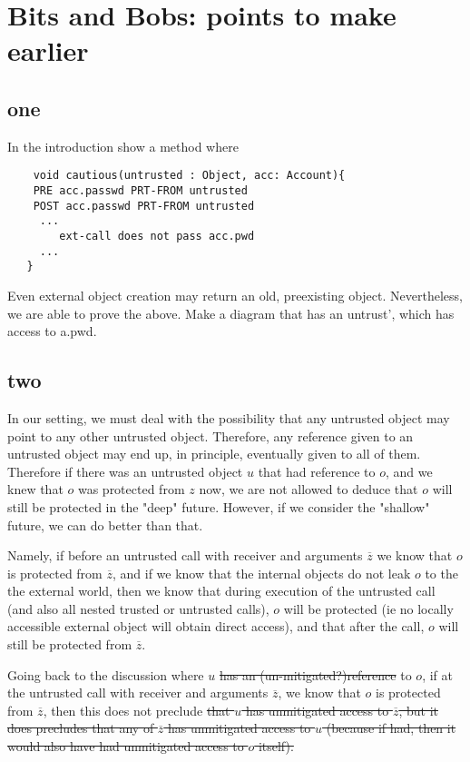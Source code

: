  \newcommand{\sdOct}[1]{#1}
\newcommand{\re}{\mathit{e}}

\section{Bits and Bobs: points to make earlier}

\subsection{one}
In the introduction show a method where
\begin{lstlisting}
    void cautious(untrusted : Object, acc: Account){
    PRE acc.passwd PRT-FROM untrusted
    POST acc.passwd PRT-FROM untrusted
     ...
        ext-call does not pass acc.pwd
     ...
   }
\end{lstlisting}

Even external object creation may return an old, preexisting object.
Nevertheless, we are able to prove the above. Make a diagram that has an untrust', which has access to a.pwd. 


\subsection{two}
In our setting, we must deal with the possibility  that any untrusted object may point to any other untrusted object.
Therefore, any reference given to an untrusted object may end up, in principle,  eventually given to all of them.
Therefore if there was an untrusted object $u$ that had reference to $o$,  and we knew that $o$ was protected from $z$ now, we are not
allowed   to deduce that $o$ will still be protected in the "deep" future.
However, if we consider the "shallow" future, we can do better than that.

Namely, if  before an untrusted call with receiver and arguments $\overline z$ we know that $o$ is protected from $\overline z$, and if we know that the internal objects do not leak $o$ to the the external world, then we know that during execution of the untrusted call (and also all nested trusted or untrusted calls), $o$ will be protected (ie no locally accessible external object will obtain direct access), and that after the call, $o$ will still be protected from $\overline z$.

Going back to the discussion where $u$ 
\st{has an (un-mitigated?)reference} to $o$,  if at the untrusted call
with receiver and arguments $\overline z$, we know that $o$ is
protected from $\overline z$, then this does not preclude
\st{that $u$ has unmitigated access to $\overline z$, but it does precludes that any of  $\overline z$ has unmitigated access to $u$ (because if had, then it would also have had unmitigated access to $o$ itself).}

